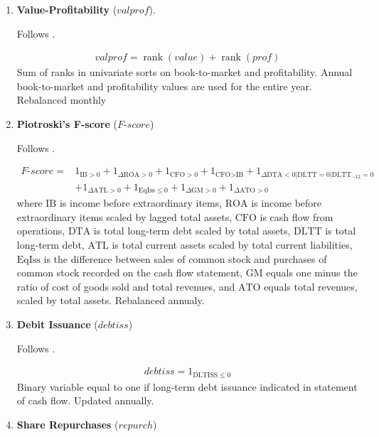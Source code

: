 \begin{enumerate}
	\item \textbf{Value-Profitability} ($valprof$).
	
	Follows . 
	
	\begin{align*}
		valprof = \operatorname{rank}(value) + \operatorname{rank}(prof)
	\end{align*}
	Sum of ranks in univariate sorts on book-to-market and profitability. Annual book-to-market and profitability values are used for the entire year. Rebalanced monthly
	
	
	
	\item \textbf{Piotroski's F-score} ($F$-$score$)
	
	Follows . 
	
	\begin{align*}
		F\text{-}score = & 1_{\text{IB}>0} + 1_{\Delta \text{ROA}>0} + 1_{\text{CFO}>0} + 1_{\text{CFO}>\text{IB}} + 1_{\Delta \text{DTA}<0 | \text{DLTT}=0 | \text{DLTT}_{-12}=0} \\
		& + 1_{\Delta \text{ATL}>0} + 1_{\text{EqIss} \leq 0} + 1_{\Delta \text{GM}>0} + 1_{\Delta \text{ATO}>0}
	\end{align*}
	where $\mathrm{IB}$ is income before extraordinary items, $\mathrm{ROA}$ is income before extraordinary items scaled by lagged total assets, $\mathrm{CFO}$ is cash flow from operations, $\mathrm{DTA}$ is total long-term debt scaled by total assets, $\mathrm{DLTT}$ is total long-term debt, $\mathrm{ATL}$ is total current assets scaled by total current liabilities, $\mathrm{EqIss}$ is the difference between sales of common stock and purchases of common stock recorded on the cash flow statement, $\mathrm{GM}$ equals one minus the ratio of cost of goods sold and total revenues, and $\mathrm{ATO}$ equals total revenues, scaled by total assets. Rebalanced annualy.
	
	
	
	\item \textbf{Debit Issuance} ($debtiss$)
	
	Follows . 
	
	\begin{align*}
		debtiss = 1_{\text{DLTISS} \leq 0}
	\end{align*}
	Binary variable equal to one if long-term debt issuance indicated in statement of cash flow. Updated annually.
	
	
	
	\item \textbf{Share Repurchases} ($repurch$)
	

\end{enumerate}
